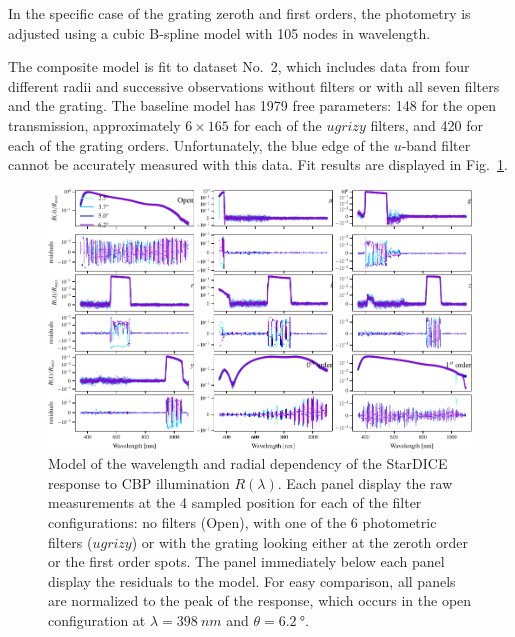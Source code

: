 In the specific case of the  grating zeroth and first orders, the photometry is
adjusted using a cubic B-spline model with \num{105} nodes in
wavelength.

The composite model is fit to dataset No.~2, which includes data
from four different radii and successive observations without filters
or with all seven filters and the grating. The baseline model has
\num{1979} free parameters: \num{148} for the open transmission,
approximately $6\times165$ for each of the $ugrizy$ filters, and
\num{420} for each of the grating orders. Unfortunately, the blue edge
of the $u$-band filter cannot be accurately measured with this
data. Fit results are displayed in
Fig.~\ref{fig:lambdathetafitresults}.

\begin{figure}
  \centering
  \includegraphics[width=1\linewidth]{./fig/lambdathetafitresults.pdf}
  \caption{Model of the wavelength and radial dependency of the
    StarDICE response to CBP illumination $R(\lambda)$. Each panel
    display the raw measurements at the 4 sampled position for each of
    the filter configurations: no filters (Open), with one of the 6
    photometric filters ($ugrizy$) or with the grating looking either
    at the zeroth order or the first order spots. The panel
    immediately below each panel display the residuals to the
    model. For easy comparison, all panels are normalized to the peak
    of the response, which occurs in the open configuration at
    $\lambda = \SI{398}{nm}$ and $\theta = \SI{6.2}{\degree}$.
 }
  \label{fig:lambdathetafitresults}
\end{figure}


